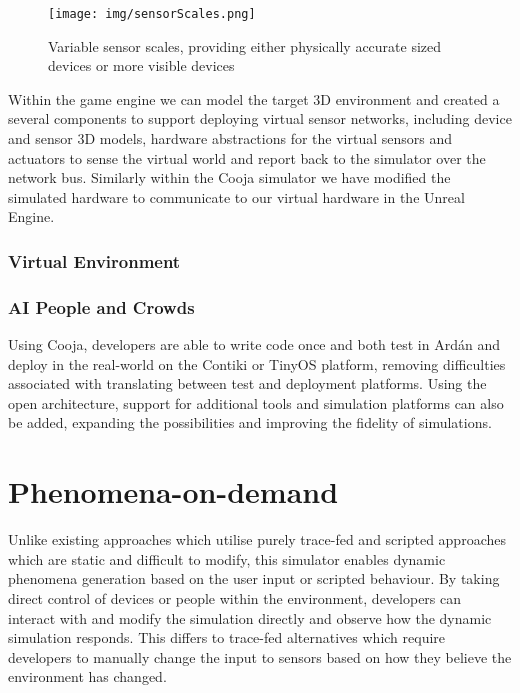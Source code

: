 \begin{figure}[h]
   \centering
   \texttt{[image: img/sensorScales.png]}
   \caption{Variable sensor scales, providing either physically accurate sized devices or more visible devices}
   \label{fig:sensor_scales}
 \end{figure} 
Within the game engine we can model the target 3D environment and created a several components to support deploying virtual sensor networks, including device and sensor 3D models, hardware abstractions for the virtual sensors and actuators to sense the virtual world and report back to the simulator over the network bus. Similarly within the Cooja simulator we have modified the simulated hardware to communicate to our virtual hardware in the Unreal Engine.
\subsubsection{Virtual Environment} %
\label{ssub:virtual_environment}


\subsubsection{AI People and Crowds} %
\label{ssub:ai_people_and_crowds}

Using Cooja, developers are able to write code once and both test in Ard\'{a}n and deploy in the real-world on the Contiki or TinyOS platform, removing difficulties associated with translating between test and deployment platforms. Using the open architecture, support for additional tools and simulation platforms can also be added, expanding the possibilities and improving the fidelity of simulations.

\section{Phenomena-on-demand} %
\label{sec:phenomena_on_demand}
Unlike existing approaches which utilise purely trace-fed and scripted approaches which are static and difficult to modify, this simulator enables dynamic phenomena generation based on the user input or scripted behaviour. 
By taking direct control of devices or people within the environment, developers can interact with and modify the simulation directly and observe how the dynamic simulation responds. This differs to trace-fed alternatives which require developers to manually change the input to sensors based on how they believe the environment has changed. 

